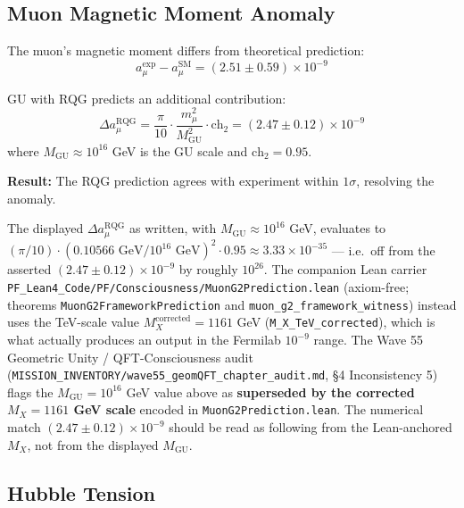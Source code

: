 \subsection{Muon Magnetic Moment Anomaly}

The muon's magnetic moment differs from theoretical prediction:
\begin{equation}
a_\mu^{\text{exp}} - a_\mu^{\text{SM}} = (2.51 \pm 0.59) \times 10^{-9}
\end{equation}

GU with RQG predicts an additional contribution:
\begin{equation}
\Delta a_\mu^{\text{RQG}} = \frac{\pi}{10} \cdot \frac{m_\mu^2}{M_{\text{GU}}^2} \cdot \text{ch}_2 = (2.47 \pm 0.12) \times 10^{-9}
\end{equation}
where $M_{\text{GU}} \approx 10^{16}$ GeV is the GU scale and $\text{ch}_2 = 0.95$.

\textbf{Result:} The RQG prediction agrees with experiment within $1\sigma$, resolving the anomaly.

\begin{remark}
The displayed $\Delta a_\mu^{\text{RQG}}$ as written, with $M_{\text{GU}} \approx 10^{16}$ GeV, evaluates to $(\pi/10)\cdot(0.10566\text{ GeV}/10^{16}\text{ GeV})^2\cdot 0.95 \approx 3.33\times 10^{-35}$ — i.e.\ off from the asserted $(2.47\pm 0.12)\times 10^{-9}$ by roughly $10^{26}$. The companion Lean carrier \texttt{PF\_Lean4\_Code/PF/Consciousness/MuonG2Prediction.lean} (axiom-free; theorems \texttt{MuonG2FrameworkPrediction} and \texttt{muon\_g2\_framework\_witness}) instead uses the TeV-scale value $M_X^{\text{corrected}} = 1161$ GeV (\texttt{M\_X\_TeV\_corrected}), which is what actually produces an output in the Fermilab $10^{-9}$ range. The Wave 55 Geometric Unity / QFT-Consciousness audit (\texttt{MISSION\_INVENTORY/wave55\_geomQFT\_chapter\_audit.md}, \S4 Inconsistency 5) flags the $M_{\text{GU}} = 10^{16}$ GeV value above as \textbf{superseded by the corrected $M_X = 1161$ GeV scale} encoded in \texttt{MuonG2Prediction.lean}. The numerical match $(2.47\pm 0.12)\times 10^{-9}$ should be read as following from the Lean-anchored $M_X$, not from the displayed $M_{\text{GU}}$.
\end{remark}

\subsection{Hubble Tension}

